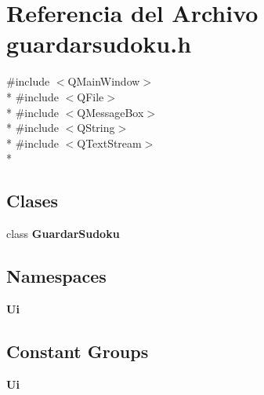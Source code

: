\section{Referencia del Archivo guardarsudoku.\-h}
\label{guardarsudoku_8h}
{\ttfamily \#include $<$Q\-Main\-Window$>$}\\*
{\ttfamily \#include $<$Q\-File$>$}\\*
{\ttfamily \#include $<$Q\-Message\-Box$>$}\\*
{\ttfamily \#include $<$Q\-String$>$}\\*
{\ttfamily \#include $<$Q\-Text\-Stream$>$}\\*
\subsection*{Clases}
\begin{DoxyCompactItemize}
\item 
class {\bf Guardar\-Sudoku}
\end{DoxyCompactItemize}
\subsection*{Namespaces}
\begin{DoxyCompactItemize}
\item 
{\bf Ui}
\end{DoxyCompactItemize}
\subsection*{Constant Groups}
\begin{DoxyCompactItemize}
\item 
{\bf Ui}
\end{DoxyCompactItemize}
